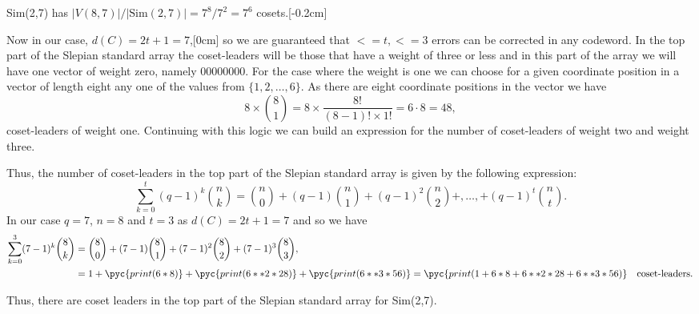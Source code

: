 Sim(2,7) has $\left|V(8,7)\right|/\left|\textrm{Sim}(2,7)\right| = 7^8/7^2 = 7^6$ cosets.[-0.2cm]

Now in our case, $d(C) = 2t + 1 = 7$,[0cm] so we are guaranteed that $<=t, <= 3$ errors can be corrected in any codeword. In the top part of the Slepian standard array the coset-leaders will be those that have a weight of three or less and in this part of the array we will have one vector of weight zero, namely $00000000$. For the case where the weight is one we can choose for a given coordinate position in a vector of length eight any one of the values from $\{1,2,\ldots,6\}$. As there are eight coordinate positions in the vector we have
\[
	8\times\binom{8}{1} = 8\times\frac{8!}{(8-1)!\times1!} = 6\cdot8=48,
\]
coset-leaders of weight one. Continuing with this logic we can build an expression for the number of coset-leaders of weight two and weight three.

Thus, the number of coset-leaders in the top part of the Slepian standard array is given by the following expression:
\[
	\sum_{k=0}^t(q-1)^k\binom{n}{k}=\binom{n}{0} + (q-1)\binom{n}{1} + (q-1)^2\binom{n}{2} +,\ldots,+ (q-1)^t\binom{n}{t}. 
\]
In our case $q=7$, $n=8$ and $t=3$ as $d(C) = 2t + 1 = 7$ and so we have
\begin{align*}
	\sum_{k=0}^3(7-1)^k\binom{8}{k}&=\binom{8}{0} + (7-1)\binom{8}{1} + (7-1)^2\binom{8}{2} + (7-1)^3\binom{8}{3},\\
	&= 1 + \pyc{print(6*8)} + \pyc{print(6**2 * 28)} + \pyc{print(6**3 * 56)} = \pyc{print(1 + 6*8 + 6**2 * 28 + 6**3 * 56)}\quad\textrm{coset-leaders}.
\end{align*}

Thus, there are  coset leaders in the top part of the Slepian standard array for Sim(2,7). 


